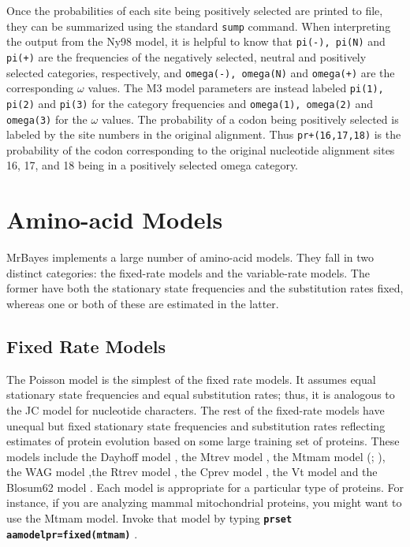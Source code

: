 \documentclass[12pt]{book}
\newcommand{\ttt}[1]{\texttt{#1} }
\newcommand{\tb}[1]{\texttt{\textbf{#1}} }
\begin{document}
Once the probabilities of each site being positively selected are printed to file, they can be
summarized using the standard \ttt{sump} command. When interpreting the output from the Ny98 model,
it is helpful to know that \ttt{pi(-), pi(N)} and \ttt{pi(+)} are the frequencies of the negatively
selected, neutral and positively selected categories, respectively, and \ttt{omega(-), omega(N)}
and \ttt{omega(+)} are the corresponding $\omega$ values. The M3 model parameters are instead
labeled \ttt{pi(1), pi(2)} and \ttt{pi(3)} for the category frequencies and \ttt{omega(1),
omega(2)} and \ttt{omega(3)} for the $\omega$ values. The probability of a codon being positively
selected is labeled by the site numbers in the original alignment.  Thus \ttt{pr+(16,17,18)} is the
probability of the codon corresponding to the original nucleotide alignment sites 16, 17, and 18
being in a positively selected omega category.

\section{Amino-acid Models}
\label{amino-acidModels}

MrBayes implements a large number of amino-acid models. They fall in two distinct categories: the
fixed-rate models and the variable-rate models. The former have both the stationary state
frequencies and the substitution rates fixed, whereas one or both of these are estimated in the
latter.

\subsection{Fixed Rate Models}
The Poisson model \citep{bishop87} is the simplest of the fixed rate models. It assumes equal
stationary state frequencies and equal substitution rates; thus, it is analogous to the JC model
for nucleotide characters. The rest of the fixed-rate models have unequal but fixed stationary
state frequencies and substitution rates reflecting estimates of protein evolution based on some
large training set of proteins. These models include the Dayhoff model \citep{dayhoff78}, the Mtrev
model \citep{adachi96}, the Mtmam model (\citet{cao98}; \citet{yang98}), the WAG model
\citep{whelan01},the Rtrev model \citep{dimmic02}, the Cprev model \citep{adachi00}, the Vt model
\citep{muller00} and the Blosum62 model \citep{henikoff92}. Each model is appropriate for a
particular type of proteins. For instance, if you are analyzing mammal mitochondrial proteins, you
might want to use the Mtmam model. Invoke that model by typing \tb{prset aamodelpr=fixed(mtmam)}.
\end{document}
